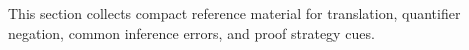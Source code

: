 \begin{remark*}[Exposition]
This section collects compact reference material for translation, quantifier
negation, common inference errors, and proof strategy cues.
\end{remark*}
